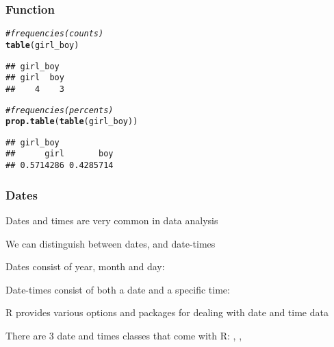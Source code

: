 \documentclass[12pt]{beamer}\usepackage[]{graphicx}\usepackage[]{color}
\makeatletter
\newcommand{\hlcom}[1]{\textcolor[rgb]{0.678,0.584,0.686}{\textit{#1}}}%
\newcommand{\hlstd}[1]{\textcolor[rgb]{0.345,0.345,0.345}{#1}}%
\newcommand{\hlkwd}[1]{\textcolor[rgb]{0.737,0.353,0.396}{\textbf{#1}}}%
\newenvironment{kframe}{%
 \def\at@end@of@kframe{}%
 \ifinner\ifhmode%
  \def\at@end@of@kframe{\end{minipage}}%
  \begin{minipage}{\columnwidth}%
 \fi\fi%
 \def\FrameCommand##1{\hskip\@totalleftmargin \hskip-\fboxsep
 \colorbox{shadecolor}{##1}\hskip-\fboxsep
     \hskip-\linewidth \hskip-\@totalleftmargin \hskip\columnwidth}%
 \MakeFramed {\advance\hsize-\width
   \@totalleftmargin\z@ \linewidth\hsize
   \@setminipage}}%
 {\par\unskip\endMakeFramed%
 \at@end@of@kframe}
\newenvironment{knitrout}{}{} %
\makeatother
\begin{document}

\begin{frame}[fragile]
\frametitle{Function }

\begin{knitrout}\footnotesize
{}\color{fgcolor}\begin{kframe}
\begin{alltt}
\hlcom{# frequencies (counts)}
\hlkwd{table}\hlstd{(girl_boy)}
\end{alltt}
\begin{verbatim}
## girl_boy
## girl  boy 
##    4    3
\end{verbatim}
\begin{alltt}
\hlcom{# frequencies (percents)}
\hlkwd{prop.table}\hlstd{(}\hlkwd{table}\hlstd{(girl_boy))}
\end{alltt}
\begin{verbatim}
## girl_boy
##      girl       boy 
## 0.5714286 0.4285714
\end{verbatim}
\end{kframe}
\end{knitrout}

\end{frame}


\begin{frame}
\begin{center}
\Huge{}
\end{center}
\end{frame}


\begin{frame}
\frametitle{Dates}

\bi
  \item Dates and times are very common in data analysis
  \item We can distinguish between dates, and date-times
  \item Dates consist of year, month and day: 
  \item Date-times consist of both a date and a specific time: 
  \item R provides various options and packages for dealing with date and time data
  \item There are 3 date and times classes that come with R: , , 
\ei

\end{frame}
\end{document}

